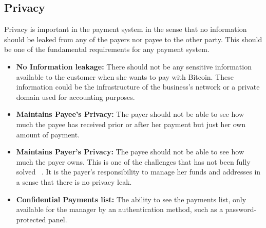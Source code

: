 \subsection{Privacy} Privacy is important in the payment system in the sense that no information should be leaked from any of the payers nor payee to the other party. This should be one of the fundamental requirements for any payment system.
\begin{itemize}

\item \textbf{No Information leakage: }There should not be any sensitive information available to the customer when she wants to pay with Bitcoin. These information could be the infrastructure of the business's network or a private domain used for accounting purposes.

\item \textbf{Maintains Payee's Privacy: }The payer should not be able to see how much the payee has received prior or after her payment but just her own amount of payment.

\item \textbf{Maintains Payer's Privacy: }The payee should not be able to see how much the payer owns. This is one of the challenges that has not been fully solved ~\cite{androulaki2013evaluating}. It is the payer's responsibility to manage her funds and addresses in a sense that there is no privacy leak.

\item \textbf{Confidential Payments list: }The ability to see the payments list, only available for the manager by an authentication method, such as a password-protected panel. 

\end{itemize}
